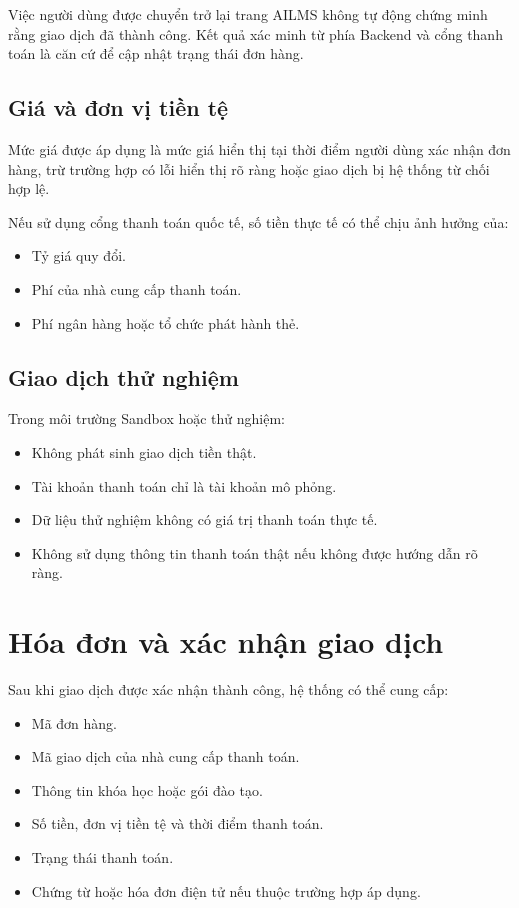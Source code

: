 \documentclass[12pt,a4paper]{article}
\begin{document}
Việc người dùng được chuyển trở lại trang AILMS không tự động chứng minh rằng
giao dịch đã thành công. Kết quả xác minh từ phía Backend và cổng thanh toán
là căn cứ để cập nhật trạng thái đơn hàng.

\subsection{Giá và đơn vị tiền tệ}

Mức giá được áp dụng là mức giá hiển thị tại thời điểm người dùng xác nhận đơn hàng,
trừ trường hợp có lỗi hiển thị rõ ràng hoặc giao dịch bị hệ thống từ chối hợp lệ.

Nếu sử dụng cổng thanh toán quốc tế, số tiền thực tế có thể chịu ảnh hưởng của:

\begin{itemize}
    \item Tỷ giá quy đổi.
    \item Phí của nhà cung cấp thanh toán.
    \item Phí ngân hàng hoặc tổ chức phát hành thẻ.
\end{itemize}

\subsection{Giao dịch thử nghiệm}

Trong môi trường Sandbox hoặc thử nghiệm:

\begin{itemize}
    \item Không phát sinh giao dịch tiền thật.
    \item Tài khoản thanh toán chỉ là tài khoản mô phỏng.
    \item Dữ liệu thử nghiệm không có giá trị thanh toán thực tế.
    \item Không sử dụng thông tin thanh toán thật nếu không được hướng dẫn rõ ràng.
\end{itemize}

\section{Hóa đơn và xác nhận giao dịch}

Sau khi giao dịch được xác nhận thành công, hệ thống có thể cung cấp:

\begin{itemize}
    \item Mã đơn hàng.
    \item Mã giao dịch của nhà cung cấp thanh toán.
    \item Thông tin khóa học hoặc gói đào tạo.
    \item Số tiền, đơn vị tiền tệ và thời điểm thanh toán.
    \item Trạng thái thanh toán.
    \item Chứng từ hoặc hóa đơn điện tử nếu thuộc trường hợp áp dụng.
\end{itemize}
\end{document}
